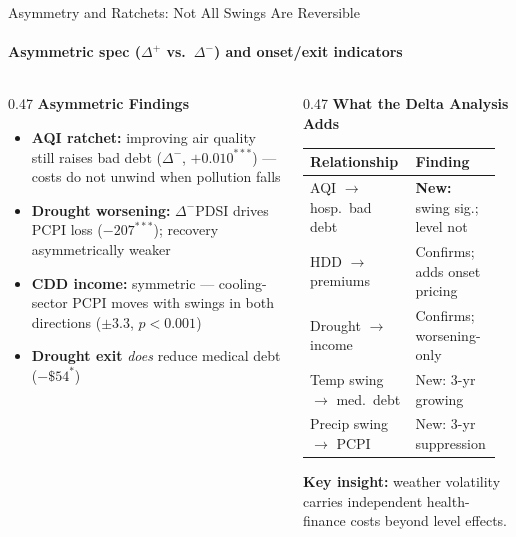 \documentclass[aspectratio=169,11pt]{beamer}
\newcommand{\emphcolor}[1]{{\color{WarmOrange}\textbf{#1}}}
\newcommand{\tealtext}[1]{{\color{Teal}#1}}
\newcommand{\graytext}[1]{{\color{WarmGray}#1}}
\begin{document}
\begin{frame}{Asymmetry and Ratchets: Not All Swings Are Reversible}
  \framesubtitle{Asymmetric spec ($\Delta^{+}$ vs.\ $\Delta^{-}$) and onset/exit indicators}
  \begin{columns}[T]
    \begin{column}{0.47\textwidth}
      \textbf{\tealtext{Asymmetric Findings}}\\[0.15em]
      \footnotesize
      \begin{itemize}\itemsep0.13em
        \item \emphcolor{AQI ratchet:} improving air quality still raises bad debt ($\Delta^{-}$, $+0.010^{***}$) --- costs do not unwind when pollution falls
        \item \emphcolor{Drought worsening:} $\Delta^{-}$PDSI drives PCPI loss ($-207^{***}$); recovery asymmetrically weaker
        \item \emphcolor{CDD income:} symmetric --- cooling-sector PCPI moves with swings in both directions ($\pm 3.3$, $p{<}0.001$)
        \item \emphcolor{Drought exit} \emph{does} reduce medical debt ($-\$54^{*}$)
      \end{itemize}
    \end{column}
    \begin{column}{0.47\textwidth}
      \textbf{\tealtext{What the Delta Analysis Adds}}\\[0.15em]
      \footnotesize
      \renewcommand{\arraystretch}{1.25}
      \begin{tabular}{@{}>{\raggedright\arraybackslash}p{0.52\linewidth}>{\raggedright\arraybackslash}p{0.40\linewidth}@{}}
        \toprule
        Relationship & Finding \\
        \midrule
        AQI $\to$ hosp.\ bad debt & \emphcolor{New:} swing sig.; level not \\
        HDD $\to$ premiums & Confirms; adds onset pricing \\
        Drought $\to$ income & Confirms; worsening-only \\
        Temp swing $\to$ med.\ debt & New: 3-yr growing \\
        Precip swing $\to$ PCPI & New: 3-yr suppression \\
        \bottomrule
      \end{tabular}
      \vspace{0.2em}
      \graytext{\scriptsize \textbf{Key insight:} weather volatility carries independent health-finance costs beyond level effects.}
    \end{column}
  \end{columns}
\end{frame}
\end{document}
